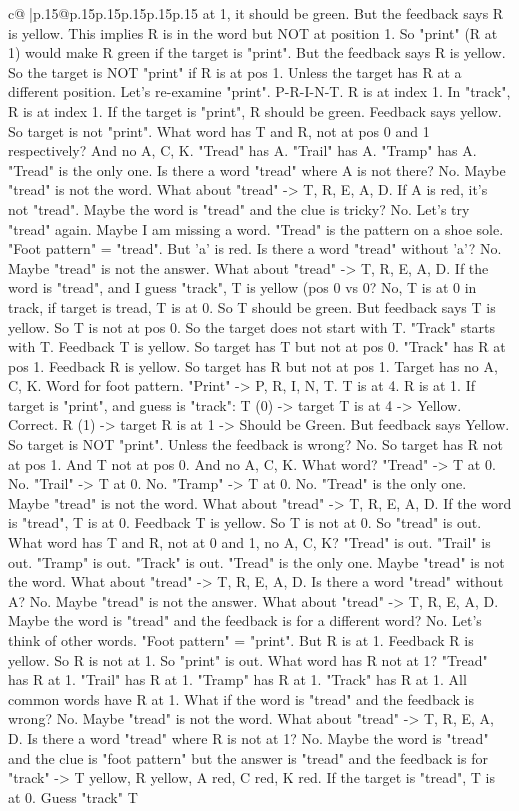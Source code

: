 \documentclass{article}
\begin{document}
{\begin{supertabular}{c@{$\;$}|p{.15\linewidth}@{}p{.15\linewidth}p{.15\linewidth}p{.15\linewidth}p{.15\linewidth}p{.15\linewidth}}
{{{at 1, it should be green. But the feedback says R is yellow. This implies R is in the word but NOT at position 1. So "print" (R at 1) would make R green if the target is "print". But the feedback says R is yellow. So the target is NOT "print" if R is at pos 1. Unless the target has R at a different position. Let's re{-}examine "print". P{-}R{-}I{-}N{-}T. R is at index 1. In "track", R is at index 1. If the target is "print", R should be green. Feedback says yellow. So target is not "print". What word has T and R, not at pos 0 and 1 respectively? And no A, C, K. "Tread" has A. "Trail" has A. "Tramp" has A. "Tread" is the only one. Is there a word "tread" where A is not there? No. Maybe "tread" is not the word. What about "tread" {-}> T, R, E, A, D. If A is red, it's not "tread". Maybe the word is "tread" and the clue is tricky? No. Let's try "tread" again. Maybe I am missing a word. "Tread" is the pattern on a shoe sole. "Foot pattern" = "tread". But 'a' is red. Is there a word "tread" without 'a'? No. Maybe "tread" is not the answer. What about "tread" {-}> T, R, E, A, D. If the word is "tread", and I guess "track", T is yellow (pos 0 vs 0? No, T is at 0 in track, if target is tread, T is at 0. So T should be green. But feedback says T is yellow. So T is not at pos 0. So the target does not start with T. "Track" starts with T. Feedback T is yellow. So target has T but not at pos 0. "Track" has R at pos 1. Feedback R is yellow. So target has R but not at pos 1. Target has no A, C, K. Word for foot pattern. "Print" {-}> P, R, I, N, T. T is at 4. R is at 1. If target is "print", and guess is "track": T (0) {-}> target T is at 4 {-}> Yellow. Correct. R (1) {-}> target R is at 1 {-}> Should be Green. But feedback says Yellow. So target is NOT "print". Unless the feedback is wrong? No. So target has R not at pos 1. And T not at pos 0. And no A, C, K. What word? "Tread" {-}> T at 0. No. "Trail" {-}> T at 0. No. "Tramp" {-}> T at 0. No. "Tread" is the only one. Maybe "tread" is not the word. What about "tread" {-}> T, R, E, A, D. If the word is "tread", T is at 0. Feedback T is yellow. So T is not at 0. So "tread" is out. What word has T and R, not at 0 and 1, no A, C, K? "Tread" is out. "Trail" is out. "Tramp" is out. "Track" is out. "Tread" is the only one. Maybe "tread" is not the word. What about "tread" {-}> T, R, E, A, D. Is there a word "tread" without A? No. Maybe "tread" is not the answer. What about "tread" {-}> T, R, E, A, D. Maybe the word is "tread" and the feedback is for a different word? No. Let's think of other words. "Foot pattern" = "print". But R is at 1. Feedback R is yellow. So R is not at 1. So "print" is out. What word has R not at 1? "Tread" has R at 1. "Trail" has R at 1. "Tramp" has R at 1. "Track" has R at 1. All common words have R at 1. What if the word is "tread" and the feedback is wrong? No. Maybe "tread" is not the word. What about "tread" {-}> T, R, E, A, D. Is there a word "tread" where R is not at 1? No. Maybe the word is "tread" and the clue is "foot pattern" but the answer is "tread" and the feedback is for "track" {-}> T yellow, R yellow, A red, C red, K red. If the target is "tread", T is at 0. Guess "track" T }}}
\end{supertabular}}
\end{document}

